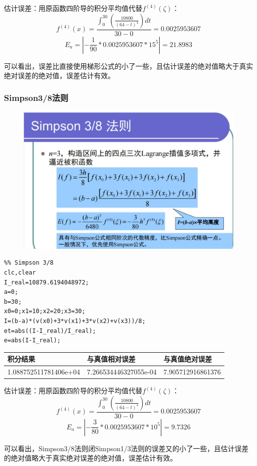 \documentclass[a4paper,12pt]{ctexart}
\begin{document}
\par
估计误差：用原函数四阶导的积分平均值代替$f^{(4)}(\zeta)$：
\begin{equation}
    f^{(4)}(x)=\frac{\int_{0}^{30}(\frac{10800}{(64-t)^4})dt}{30-0}=0.0025953607
\end{equation}
\begin{equation}
    E_a=|-\frac{1}{90}*0.0025953607*15^5|=21.8983
\end{equation}
\par
可以看出，误差比直接使用梯形公式的小了一些，且估计误差的绝对值略大于真实绝对误差的绝对值，误差估计有效。


\subsubsection{Simpson3/8法则}
\begin{figure}[H]
    \centering
    \includegraphics[width=14cm]{第五章作业/simpson3.jpg}
\end{figure}
\begin{lstlisting}
%% Simpson 3/8
clc,clear
I_real=10879.6194048972;
a=0;
b=30;
x0=0;x1=10;x2=20;x3=30;
I=(b-a)*(v(x0)+3*v(x1)+3*v(x2)+v(x3))/8;
et=abs((I-I_real)/I_real);
e=abs(I-I_real);
\end{lstlisting}
\begin{table}[H]
    \centering
    \begin{tabular}{lll}
        \hline
        积分结果              & 与真值相对误差        & 与真值绝对误差    \\ \hline
        1.088752511781406e+04 & 7.266534446327055e-04 & 7.905712916861376 \\ \hline
    \end{tabular}
\end{table}
\par
估计误差：用原函数四阶导的积分平均值代替$f^{(4)}(\zeta)$：
\begin{equation}
    f^{(4)}(x)=\frac{\int_{0}^{30}(\frac{10800}{(64-t)^4})dt}{30-0}=0.0025953607
\end{equation}
\begin{equation}
    E_a=|-\frac{3}{80}*0.0025953607*10^5|=9.7326
\end{equation}
\par
可以看出，Simpson3/8法则闭Simpson1/3法则的误差又的小了一些，且估计误差的绝对值略大于真实绝对误差的绝对值，误差估计有效。
\end{document}
